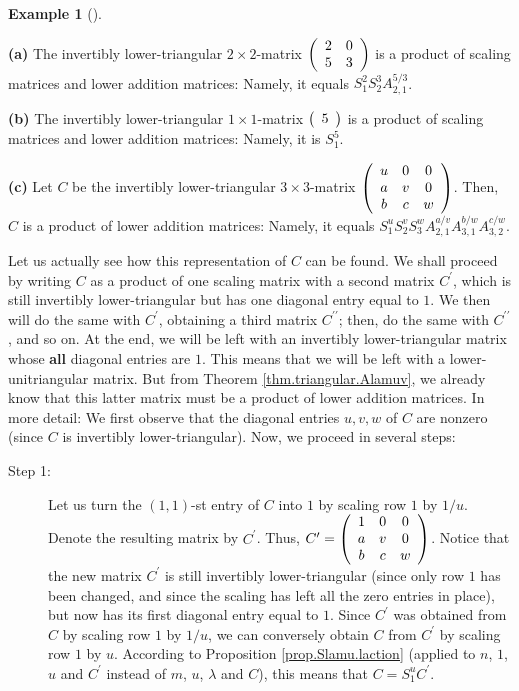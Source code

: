 \documentclass[numbers=enddot,12pt,final,onecolumn,notitlepage]{scrartcl}%
\theoremstyle{definition}
\newtheorem{exam}[theo]{Example}
\newenvironment{example}[1][]
{\begin{exam}[#1]\begin{leftbar}}
{\end{leftbar}\end{exam}}
\begin{document}
\begin{example}
\label{exam.thm.triangular.Slamu}\textbf{(a)} The invertibly lower-triangular
$2\times2$-matrix $\left(
\begin{array}
[c]{cc}%
2 & 0\\
5 & 3
\end{array}
\right)  $ is a product of scaling matrices and lower addition matrices:
Namely, it equals $S_{1}^{2}S_{2}^{3}A_{2,1}^{5/3}$.

\textbf{(b)} The invertibly lower-triangular $1\times1$-matrix $\left(
\begin{array}
[c]{c}%
5
\end{array}
\right)  $ is a product of scaling matrices and lower addition matrices:
Namely, it is $S_{1}^{5}$.

\textbf{(c)} Let $C$ be the invertibly lower-triangular $3\times3$-matrix
$\left(
\begin{array}
[c]{ccc}%
u & 0 & 0\\
a & v & 0\\
b & c & w
\end{array}
\right)  $. Then, $C$ is a product of lower addition matrices: Namely, it
equals $S_{1}^{u}S_{2}^{v}S_{3}^{w}A_{2,1}^{a/v}A_{3,1}^{b/w}A_{3,2}^{c/w}$.

Let us actually see how this representation of $C$ can be found. We shall
proceed by writing $C$ as a product of one scaling matrix with a second matrix
$C^{\prime}$, which is still invertibly lower-triangular but has one diagonal
entry equal to $1$. We then will do the same with $C^{\prime}$, obtaining a
third matrix $C^{\prime\prime}$; then, do the same with $C^{\prime\prime}$,
and so on. At the end, we will be left with an invertibly lower-triangular
matrix whose \textbf{all} diagonal entries are $1$. This means that we will be
left with a lower-unitriangular matrix. But from Theorem
\ref{thm.triangular.Alamuv}, we already know that this latter matrix must be a
product of lower addition matrices. In more detail: We first observe that the
diagonal entries $u,v,w$ of $C$ are nonzero (since $C$ is invertibly
lower-triangular). Now, we proceed in several steps:

\begin{description}
\item[Step 1:] Let us turn the $\left(  1,1\right)  $-st entry of $C$ into $1$
by scaling row $1$ by $1/u$. Denote the resulting matrix by $C^{\prime}$.
Thus, $C^{\prime}=\left(
\begin{array}
[c]{ccc}%
1 & 0 & 0\\
a & v & 0\\
b & c & w
\end{array}
\right)  $. Notice that the new matrix $C^{\prime}$ is still invertibly
lower-triangular (since only row $1$ has been changed, and since the scaling
has left all the zero entries in place), but now has its first diagonal entry
equal to $1$. Since $C^{\prime}$ was obtained from $C$ by scaling row $1$ by
$1/u$, we can conversely obtain $C$ from $C^{\prime}$ by scaling row $1$ by
$u$. According to Proposition \ref{prop.Slamu.laction} (applied to $n$, $1$,
$u$ and $C^{\prime}$ instead of $m$, $u$, $\lambda$ and $C$), this means that
$C=S_{1}^{u}C^{\prime}$.


\end{description}
\end{example}
\end{document}
